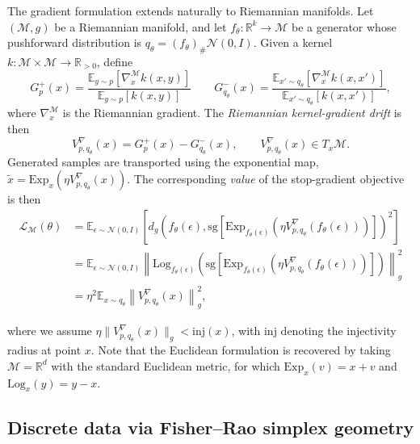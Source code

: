 \documentclass{article}
\theoremstyle{plain}
\newcommand{\M}{\mathcal{M}}
\newcommand{\Exp}{\mathrm{Exp}}
\newcommand{\Log}{\mathrm{Log}}
\begin{document}
The gradient formulation extends naturally to Riemannian manifolds. Let
\((\M,g)\) be a Riemannian manifold, and let
\(f_\theta:\mathbb{R}^k\to\M\) be a generator whose pushforward distribution is
\(q_\theta=(f_\theta)_{\#}\mathcal{N}(0,I)\). Given a kernel
\(k:\M\times\M\to\mathbb{R}_{>0}\), define
\begin{equation}
\label{eq:riemannian_gradient_component}
G_{p}^+(x)
=
\frac{
\mathbb{E}_{y\sim p}\!\left[\nabla_x^{\M} k(x,y)\right]
}{
\mathbb{E}_{y\sim p}\!\left[k(x,y)\right]
} \qquad  G_{q_\theta}^-(x)
=
\frac{
\mathbb{E}_{x'\sim q_\theta}\!\left[\nabla_x^{\M} k(x,x')\right]
}{
\mathbb{E}_{x'\sim q_\theta}\!\left[k(x,x')\right]
},
\end{equation}
where \(\nabla_x^{\M}\) is the Riemannian gradient. The \textit{Riemannian
kernel-gradient drift} is then
\begin{equation}
\label{eq:riemannian_gradient_drift}
V^\nabla_{p,q_\theta}(x)
=
G_{p}^+(x)-G_{q_\theta}^-(x),
\qquad
V^\nabla_{p,q_\theta}(x)\in T_x\M.
\end{equation}
Generated samples are transported using the exponential map,
$ \widetilde{x} = \Exp_x\!\left(
\eta V^\nabla_{p,q_\theta}(x)
\right)$. The corresponding \textit{value} of the stop-gradient objective is then
\begin{equation}
\label{eq:riemannian_loss}
\begin{aligned}
\mathcal{L}_{\M}(\theta)
&=
\mathbb{E}_{\epsilon\sim\mathcal{N}(0,I)}
\left[
d_g\!\left(
f_\theta(\epsilon),
\mathrm{sg}\!\left[
\Exp_{f_\theta(\epsilon)}
\!\left(
\eta V^\nabla_{p,q_\theta}(f_\theta(\epsilon))
\right)
\right]
\right)^2
\right]
\\
&=
\mathbb{E}_{\epsilon\sim\mathcal{N}(0,I)}
\left\|
\Log_{f_\theta(\epsilon)}
\!\left(
\mathrm{sg}\!\left[
\Exp_{f_\theta(\epsilon)}
\!\left(
\eta V^\nabla_{p,q_\theta}(f_\theta(\epsilon))
\right)
\right]
\right)
\right\|_g^2
\\
&=
\eta^2
\mathbb{E}_{x\sim q_\theta}
\left\|
V^\nabla_{p,q_\theta}(x)
\right\|_g^2,
\end{aligned}
\end{equation}

where we assume $\eta \|V^\nabla_{p,q_\theta}(x)\|_g < \mathrm{inj}(x)$, with $\mathrm{inj}$ denoting the injectivity radius at point $x$. Note that the Euclidean formulation is recovered by taking \(\M=\mathbb{R}^d\) with the
standard Euclidean metric, for which $\Exp_x(v)=x+v $ and $\Log_x(y)=y-x $.

\subsection{Discrete data via Fisher--Rao simplex geometry}
\label{sec:discrete_simplex}
\end{document}
